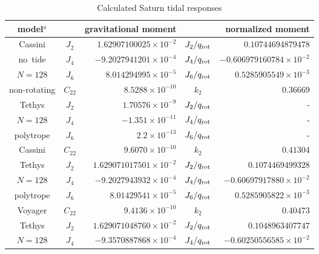 %
\begin{table}
    \centering
\caption{Calculated Saturn tidal responses \label{tab:saturn_results}}
\begin{tabular}{ccrcr}
    \hline
    {model$^a$} &  & gravitational moment  & & normalized moment \\
    \hline
{Cassini} &  $J_2$     &  $1.62907100025\times10^{-2}   $  &  $J_2/q_{\rm  rot}$  &  $0.10744694879478             $  \\
 {no~tide}   &  $J_4$     &  $-9.2027941201\times10^{-4}   $  &  $J_4/q_{\rm  rot}$  &  $-0.606979160784\times10^{-2} $  \\
 {$N=128$}  &  $J_6$     &  $8.014294995\times10^{-5}     $  &  $J_6/q_{\rm  rot}$  &  $0.5285905549\times10^{-3}    $  \\
 \hline
{non-rotating}  & $C_{22}$  &  $8.5288\times10^{-10}         $  &  $k_2         $      &  $0.36669                      $ \\
{Tethys}        & $J_2$     &  $1.70576\times10^{-9}         $  &  $J_2/q_{\rm  rot}$  &  {-}               \\
{$N=128$}       & $J_4$     &  $-1.351\times10^{-11}         $  &  $J_4/q_{\rm  rot}$  &  {-}               \\
{polytrope}                        & $J_6$     &  $2.2\times10^{-13}            $  &  $J_6/q_{\rm  rot}$  &  {-}               \\
\hline
{Cassini}  & $C_{22}$  &  $9.6070\times10^{-10}         $  &  $k_2         $      &  $0.41304                      $ \\
{Tethys}   & $J_2$     &  $1.629071017501\times10^{-2}  $  &  $J_2/q_{\rm  rot}$  &  $0.1074469499328              $ \\
{$N=128$}  & $J_4$     &  $-9.2027943932\times10^{-4}   $  &  $J_4/q_{\rm  rot}$  &  $-0.60697917880\times10^{-2}  $ \\
{polytrope}                   & $J_6$     &  $8.01429541\times10^{-5}      $  &  $J_6/q_{\rm  rot}$  &  $0.5285905822\times10^{-3}    $ \\
{Voyager}  & $C_{22}$  &  $9.4136\times10^{-10}         $  &  $k_2         $      &  $0.40473                      $ \\
\hline
{Tethys}   & $J_2$     &  $1.629071048760\times10^{-2}  $  &  $J_2/q_{\rm  rot}$  &  $0.1048963407747              $ \\
{$N=128$}  & $J_4$     &  $-9.3570887868\times10^{-4}   $  &  $J_4/q_{\rm  rot}$  &  $-0.60250556585\times10^{-2}  $ \\

\end{tabular}
\end{table}
